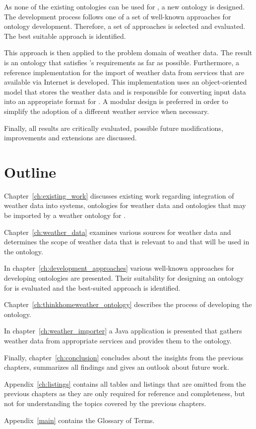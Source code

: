 As none of the existing ontologies can be used for \thinkhome, a new ontology is designed. The development process follows one of a set of well-known approaches for ontology development. Therefore, a set of approaches is selected and evaluated. The best suitable approach is identified.

This approach is then applied to the problem domain of weather data. The result is an ontology that satisfies \thinkhome's requirements as far as possible. Furthermore, a reference implementation for the import of weather data from services that are available via Internet is developed. This implementation uses an object-oriented model that stores the weather data and is responsible for converting input data into an appropriate format for \thinkhome. A modular design is preferred in order to simplify the adoption of a different weather service when necessary.

Finally, all results are critically evaluated, possible future modifications, improvements and extensions are discussed.

\section{Outline}

Chapter~\ref{ch:existing_work} discusses existing work regarding integration of weather data into \smarthome systems, ontologies for weather data and ontologies that may be imported by a weather ontology for \thinkhome.

Chapter~\ref{ch:weather_data} examines various sources for weather data and determines the scope of weather data that is relevant to \thinkhome and that will be used in the ontology.

In chapter~\ref{ch:development_approaches} various well-known approaches for developing ontologies are presented. Their suitability for designing an ontology for \thinkhome is evaluated and the best-suited approach is identified.

Chapter~\ref{ch:thinkhomeweather_ontology} describes the process of developing the ontology.

In chapter~\ref{ch:weather_importer} a Java application is presented that gathers weather data from appropriate services and provides them to the \thinkhome ontology.

Finally, chapter~\ref{ch:conclusion} concludes about the insights from the previous chapters, summarizes all findings and gives an outlook about future work.

Appendix~\ref{ch:listings} contains all tables and listings that are omitted from the previous chapters as they are only required for reference and completeness, but not for understanding the topics covered by the previous chapters.

Appendix~\ref{main} contains the Glossary of Terms.
